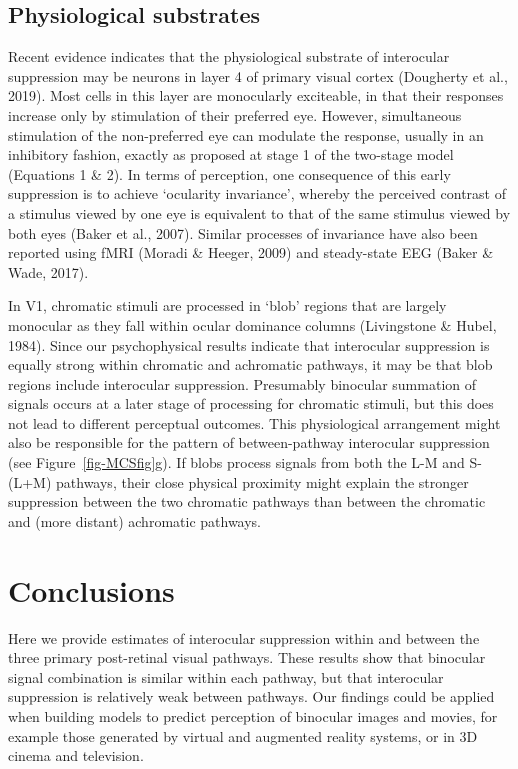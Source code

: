 \documentclass[
  letterpaper,
  DIV=11,
  numbers=noendperiod]{scrartcl}
\begin{document}
\hypertarget{physiological-substrates}{%
\subsection{Physiological substrates}\label{physiological-substrates}}

Recent evidence indicates that the physiological substrate of
interocular suppression may be neurons in layer 4 of primary visual
cortex (Dougherty et al., 2019). Most cells in this layer are
monocularly exciteable, in that their responses increase only by
stimulation of their preferred eye. However, simultaneous stimulation of
the non-preferred eye can modulate the response, usually in an
inhibitory fashion, exactly as proposed at stage 1 of the two-stage
model (Equations 1 \& 2). In terms of perception, one consequence of
this early suppression is to achieve `ocularity invariance', whereby the
perceived contrast of a stimulus viewed by one eye is equivalent to that
of the same stimulus viewed by both eyes (Baker et al., 2007). Similar
processes of invariance have also been reported using fMRI (Moradi \&
Heeger, 2009) and steady-state EEG (Baker \& Wade, 2017).

In V1, chromatic stimuli are processed in `blob' regions that are
largely monocular as they fall within ocular dominance columns
(Livingstone \& Hubel, 1984). Since our psychophysical results indicate
that interocular suppression is equally strong within chromatic and
achromatic pathways, it may be that blob regions include interocular
suppression. Presumably binocular summation of signals occurs at a later
stage of processing for chromatic stimuli, but this does not lead to
different perceptual outcomes. This physiological arrangement might also
be responsible for the pattern of between-pathway interocular
suppression (see Figure~\ref{fig-MCSfig}g). If blobs process signals
from both the L-M and S-(L+M) pathways, their close physical proximity
might explain the stronger suppression between the two chromatic
pathways than between the chromatic and (more distant) achromatic
pathways.

\hypertarget{conclusions}{%
\section{Conclusions}\label{conclusions}}

Here we provide estimates of interocular suppression within and between
the three primary post-retinal visual pathways. These results show that
binocular signal combination is similar within each pathway, but that
interocular suppression is relatively weak between pathways. Our
findings could be applied when building models to predict perception of
binocular images and movies, for example those generated by virtual and
augmented reality systems, or in 3D cinema and television.
\end{document}
